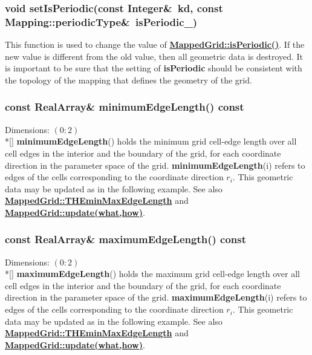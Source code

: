 \documentclass{article}
\begin{document}
  \subsubsection{void setIsPeriodic(const Integer\&~kd, const Mapping::periodicType\&~isPeriodic\_)}
  \label{MappedGrid::setIsPeriodic(kd,isPeriodic_)}
    This function is used to change the value of
    {\bf{}\hyperref{isPeriodic()}{isPeriodic() \rm(\S}{)}{MappedGrid::isPeriodic()}}.
    If the new value is different from the old value, then all geometric data is destroyed.
    It is important to be sure that the setting of \textbf{isPeriodic} should be
    consistent with the topology of the mapping that defines the geometry of the grid.

  \subsubsection{const RealArray\& minimumEdgeLength() const}
  \label{MappedGrid::minimumEdgeLength()}
    Dimensions: $(0\colon2)$ \\*[\parskip]
    \textbf{minimumEdgeLength}() holds the minimum grid cell-edge length over all
    cell edges in the interior and the boundary of the grid, for each coordinate
    direction in the parameter space of the grid.
    \textbf{minimumEdgeLength}(i) refers to edges of the cells corresponding to
    the coordinate direction $r_i$.
    This geometric data may be updated as in the following example.
    See also {\bf{}\hyperref{THEminMaxEdgeLength}{THEminMaxEdgeLength \rm(\S}{)}{MappedGrid::THEminMaxEdgeLength}}
    and {\bf{}\hyperref{update(what,how)}{update(what,how) \rm(\S}{)}{MappedGrid::update(what,how)}}.

  \subsubsection{const RealArray\& maximumEdgeLength() const}
  \label{MappedGrid::maximumEdgeLength()}
    Dimensions: $(0\colon2)$ \\*[\parskip]
    \textbf{maximumEdgeLength}() holds the maximum grid cell-edge length over all
    cell edges in the interior and the boundary of the grid, for each coordinate
    direction in the parameter space of the grid.
    \textbf{maximumEdgeLength}(i) refers to edges of the cells corresponding to
    the coordinate direction $r_i$.
    This geometric data may be updated as in the following example.
    See also {\bf{}\hyperref{THEminMaxEdgeLength}{THEminMaxEdgeLength \rm(\S}{)}{MappedGrid::THEminMaxEdgeLength}}
    and {\bf{}\hyperref{update(what,how)}{update(what,how) \rm(\S}{)}{MappedGrid::update(what,how)}}.
\end{document}
